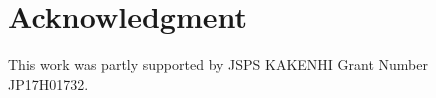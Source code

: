 \documentclass[journal]{IEEEtran}
\begin{document}


\section*{Acknowledgment}
This work was partly supported by JSPS KAKENHI Grant Number JP17H01732.

\ifCLASSOPTIONcaptionsoff
  \newpage
\fi


\end{document}

